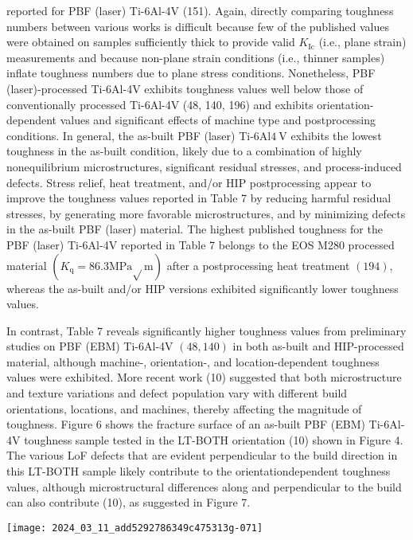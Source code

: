 \documentclass[10pt]{article}
\begin{document}
reported for PBF (laser) Ti-6Al-4V (151). Again, directly comparing toughness numbers between various works is difficult because few of the published values were obtained on samples sufficiently thick to provide valid $K_{\mathrm{Ic}}$ (i.e., plane strain) measurements and because non-plane strain conditions (i.e., thinner samples) inflate toughness numbers due to plane stress conditions. Nonetheless, PBF (laser)-processed Ti-6Al-4V exhibits toughness values well below those of conventionally processed Ti-6Al-4V (48, 140, 196) and exhibits orientation-dependent values and significant effects of machine type and postprocessing conditions. In general, the as-built PBF (laser) Ti-6Al$4 \mathrm{~V}$ exhibits the lowest toughness in the as-built condition, likely due to a combination of highly nonequilibrium microstructures, significant residual stresses, and process-induced defects. Stress relief, heat treatment, and/or HIP postprocessing appear to improve the toughness values reported in Table 7 by reducing harmful residual stresses, by generating more favorable microstructures, and by minimizing defects in the as-built PBF (laser) material. The highest published toughness for the PBF (laser) Ti-6Al-4V reported in Table 7 belongs to the EOS M280 processed material $\left(K_{\mathrm{q}}=86.3 \mathrm{MPa} \sqrt{ } \mathrm{m}\right)$ after a postprocessing heat treatment $(194)$, whereas the as-built and/or HIP versions exhibited significantly lower toughness values.

In contrast, Table 7 reveals significantly higher toughness values from preliminary studies on PBF (EBM) Ti-6Al-4V $(48,140)$ in both as-built and HIP-processed material, although machine-, orientation-, and location-dependent toughness values were exhibited. More recent work (10) suggested that both microstructure and texture variations and defect population vary with different build orientations, locations, and machines, thereby affecting the magnitude of toughness. Figure 6 shows the fracture surface of an as-built PBF (EBM) Ti-6Al-4V toughness sample tested in the LT-BOTH orientation (10) shown in Figure 4. The various LoF defects that are evident perpendicular to the build direction in this LT-BOTH sample likely contribute to the orientationdependent toughness values, although microstructural differences along and perpendicular to the build can also contribute (10), as suggested in Figure 7.

\begin{center}
\texttt{[image: 2024\_03\_11\_add5292786349c475313g-071]}
\end{center}
\end{document}
